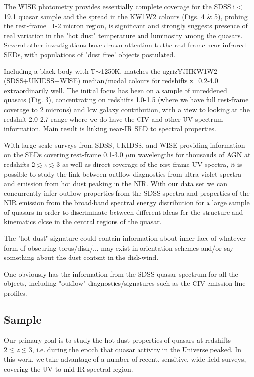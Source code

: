 The WISE photometry provides essentially complete coverage for the SDSS i$<$19.1 quasar sample and the spread in the KW1W2 colours (Figs. 4 \& 5), probing the rest-frame ~1-2 micron region, is significant and strongly suggests presence of real variation in the "hot dust" temperature and luminosity among the quasars. 
Several other investigations have drawn attention to the rest-frame near-infrared SEDs, with populations of "dust free" objects postulated. 

Including a black-body with T$\sim$1250K, matches the ugrizYJHKW1W2 (SDSS+UKIDSS+WISE) median/modal colours for redshifts z=0.2-4.0 extraordinarily well. 
The initial focus has been on a sample of unreddened quasars (Fig. 3), concentrating on redshifts 1.0-1.5 (where we have full rest-frame coverage to 2 microns) and low galaxy contribution, with a view to looking at the redshift 2.0-2.7 range where we do have the CIV and other UV-spectrum information. 
Main result is linking near-IR SED to spectral properties.

With large-scale surveys from SDSS, UKIDSS, and WISE providing information on the SEDs covering rest-frame 0.1-3.0 $\mu$m wavelengths for thousands of AGN at redshifts $2 \lesssim z \lesssim 3$ as well as direct coverage of the rest-frame-UV spectra, it is possible to study the link between outflow diagnostics from ultra-violet spectra and emission from hot dust peaking in the NIR. With our data set we can concurrently infer outflow properties from the SDSS spectra and properties of the NIR emission from the broad-band spectral energy distribution for a large sample of quasars in order to discriminate between different ideas for the structure and kinematics close in the central regions of the quasar. 

The "hot dust" signature could contain information about inner face of whatever form of obscuring torus/disk/... may exist in orientation schemes and/or say something about the dust content in the disk-wind.

One obviously has the information from the SDSS quasar spectrum for all the objects, including "outflow" diagnostics/signatures such as the CIV emission-line profiles.

\subsection{Sample}

Our primary goal is to study the hot dust properties of quasars at redshifts $2 \lesssim z \lesssim 3$, i.e. during the epoch that quasar activity in the Universe peaked. 
In this work, we take advantage of a number of recent, sensitive, wide-field surveys, covering the UV to mid-IR spectral region. 

